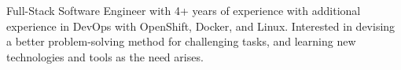 

\begin{cvparagraph}

	Full-Stack Software Engineer with 4+ years of experience with additional experience in DevOps with OpenShift, Docker, and Linux. Interested in devising a better problem-solving method for challenging tasks, and learning new technologies and tools as the need arises.
\end{cvparagraph}
